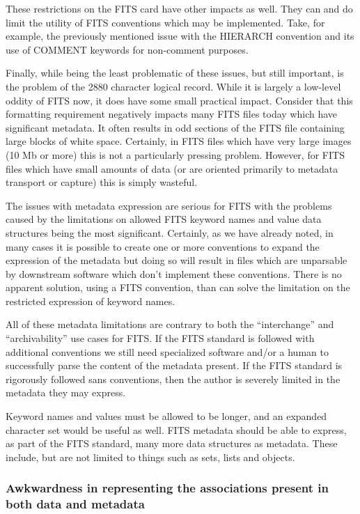 \documentclass[final,authoryear,5p,times,twocolumn]{elsarticle}
\begin{document}
These restrictions on the FITS card have other impacts as well. They
can and do limit the utility of FITS conventions which may be
implemented. Take, for example, the previously mentioned issue with
the HIERARCH convention and its use of COMMENT keywords for
non-comment purposes.


Finally, while being the least problematic of these issues, but still
important, is the problem of the 2880 character logical record. While
it is largely a low-level oddity of FITS now, it does have some small
practical impact. Consider that this formatting requirement negatively
impacts many FITS files today which have significant metadata. It
often results in odd sections of the FITS file containing large blocks
of white space. Certainly, in FITS files which have very large images
(10 Mb or more) this is not a particularly pressing
problem. However, for FITS files which have small amounts of data (or
are oriented primarily to metadata transport or capture) this is
simply wasteful.


The issues with metadata expression are serious for FITS with the
problems caused by the limitations on allowed FITS keyword names and
value data structures being the most significant. Certainly, as we
have already noted, in many cases it is possible to create one or more
conventions to expand the expression of the metadata but doing so will
result in files which are unparsable by downstream software which
don't implement these conventions. There is no apparent solution,
using a FITS convention, than can solve the limitation on the
restricted expression of keyword names.


All of these metadata limitations are contrary to both the
``interchange'' and ``archivability'' use cases for FITS. If the FITS
standard is followed with additional conventions we still need
specialized software and/or a human to successfully parse the content
of the metadata present. If the FITS standard is rigorously followed
sans conventions, then the author is severely limited in the metadata
they may express.


Keyword names and values must be allowed to be longer, and an expanded
character set would be useful as well. FITS metadata should be able to
express, as part of the FITS standard, many more data structures as
metadata. These include, but are not limited to things such as sets,
lists and objects.


\subsubsection{Awkwardness in representing the associations present in both data and metadata}
\end{document}
